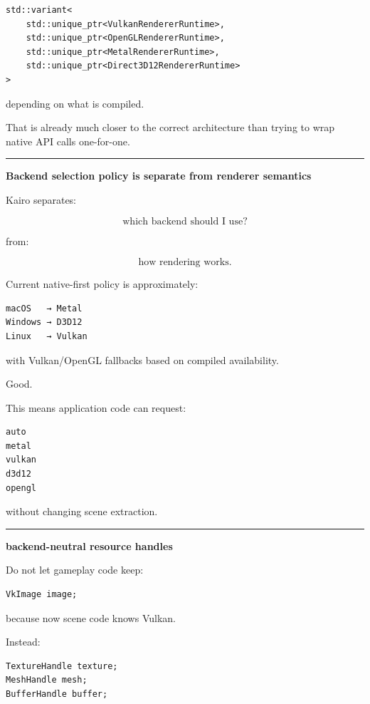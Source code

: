 \begin{verbatim}
std::variant<
    std::unique_ptr<VulkanRendererRuntime>,
    std::unique_ptr<OpenGLRendererRuntime>,
    std::unique_ptr<MetalRendererRuntime>,
    std::unique_ptr<Direct3D12RendererRuntime>
>
\end{verbatim}

depending on what is compiled.

That is already much closer to the correct architecture than trying to wrap native API calls one-for-one.

\begin{center}\rule{0.5\linewidth}{0.5pt}\end{center}

\textbf{Backend selection policy is separate from renderer semantics}

Kairo separates:

\[
\text{which backend should I use?}
\]

from:

\[
\text{how rendering works}.
\]

Current native-first policy is approximately:

\begin{verbatim}
macOS   → Metal
Windows → D3D12
Linux   → Vulkan
\end{verbatim}

with Vulkan/OpenGL fallbacks based on compiled availability.

Good.

This means application code can request:

\begin{verbatim}
auto
metal
vulkan
d3d12
opengl
\end{verbatim}

without changing scene extraction.

\begin{center}\rule{0.5\linewidth}{0.5pt}\end{center}

\textbf{backend-neutral resource handles}

Do not let gameplay code keep:

\begin{verbatim}
VkImage image;
\end{verbatim}

because now scene code knows Vulkan.

Instead:

\begin{verbatim}
TextureHandle texture;
MeshHandle mesh;
BufferHandle buffer;
\end{verbatim}

